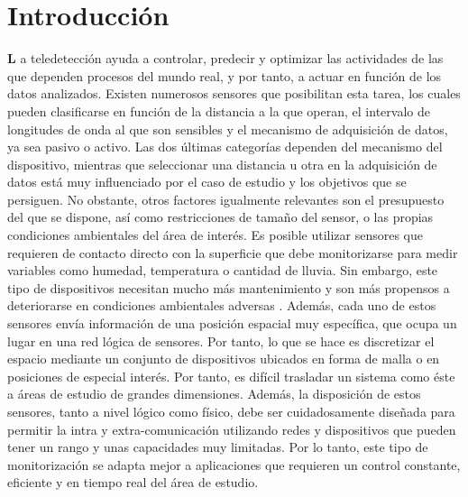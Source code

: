 \setchapterpreamble[u]{\margintoc}
\chapter*{Introducción}
\label{sec:introduction_spanish}

\lettrine[findent=0pt, lines=3]{\textbf{L}}{ }a teledetección ayuda a controlar, predecir y optimizar las actividades de las que dependen procesos del mundo real, y por tanto, a actuar en función de los datos analizados. Existen numerosos sensores que posibilitan esta tarea, los cuales pueden clasificarse en función de la distancia a la que operan, el intervalo de longitudes de onda al que son sensibles y el mecanismo de adquisición de datos, ya sea pasivo o activo. Las dos últimas categorías dependen del mecanismo del dispositivo, mientras que seleccionar una distancia u otra en la adquisición de datos está muy influenciado por el caso de estudio y los objetivos que se persiguen. No obstante, otros factores igualmente relevantes son el presupuesto del que se dispone, así como restricciones de tamaño del sensor, o las propias condiciones ambientales del área de interés. Es posible utilizar sensores que requieren de contacto directo con la superficie que debe monitorizarse para medir variables como humedad, temperatura o cantidad de lluvia. Sin embargo, este tipo de dispositivos necesitan mucho más mantenimiento y son más propensos a deteriorarse en condiciones ambientales adversas \cite{silva_low-cost_2019, morais_versatile_2021}. Además, cada uno de estos sensores envía información de una posición espacial muy específica, que ocupa un lugar en una red lógica de sensores. Por tanto, lo que se hace es discretizar el espacio mediante un conjunto de dispositivos ubicados en forma de malla o en posiciones de especial interés. Por tanto, es difícil trasladar un sistema como éste a áreas de estudio de grandes dimensiones. Además, la disposición de estos sensores, tanto a nivel lógico como físico, debe ser cuidadosamente diseñada para permitir la intra y extra-comunicación utilizando redes y dispositivos que pueden tener un rango y unas capacidades muy limitadas. Por lo tanto, este tipo de monitorización se adapta mejor a aplicaciones que requieren un control constante, eficiente y en tiempo real del área de estudio. 

